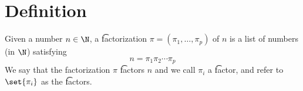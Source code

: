 
\section*{Definition}

Given a number $n \in \N  $, a \t{factorization} $\pi  = (\pi _1, \dots , \pi _p)$ of $n$ is a list of numbers (in $\N  $) satisfying
\[
n = \pi _1\pi _2\cdots\pi _p
\]
We say that the factorization $\pi $ \t{factors} $n$ and we call $\pi _i$ a \t{factor}, and refer to $\set{\pi _i}$ as the \t{factors}.

\blankpage